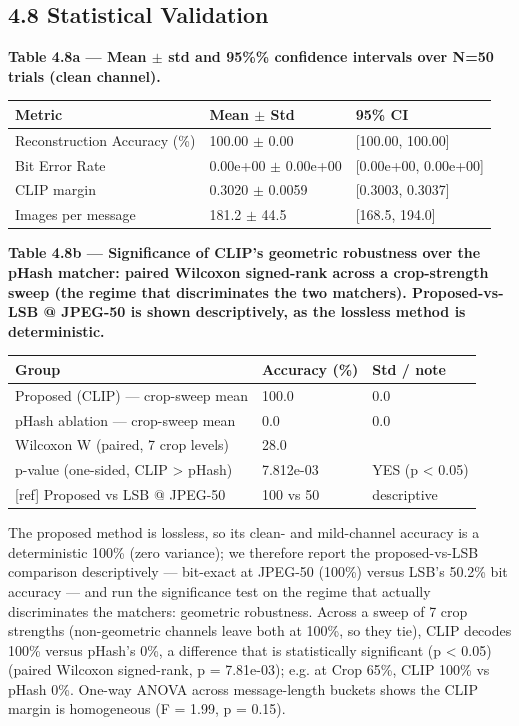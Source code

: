 \documentclass[11pt]{article}
\begin{document}
\subsection*{4.8 Statistical Validation}
\textbf{Table 4.8a --- Mean $\pm$ std and 95\%\% confidence intervals over N=50 trials (clean channel).}
\begin{table}[H]\centering\small
\begin{tabularx}{\textwidth}{lXX}
\toprule
Metric & Mean $\pm$ Std & 95\% CI \\
\midrule
Reconstruction Accuracy (\%) & 100.00 $\pm$ 0.00 & {}[100.00, 100.00] \\
Bit Error Rate & 0.00e+00 $\pm$ 0.00e+00 & {}[0.00e+00, 0.00e+00] \\
CLIP margin & 0.3020 $\pm$ 0.0059 & {}[0.3003, 0.3037] \\
Images per message & 181.2 $\pm$ 44.5 & {}[168.5, 194.0] \\
\bottomrule
\end{tabularx}
\end{table}
\textbf{Table 4.8b --- Significance of CLIP's geometric robustness over the pHash matcher: paired Wilcoxon signed-rank across a crop-strength sweep (the regime that discriminates the two matchers). Proposed-vs-LSB @ JPEG-50 is shown descriptively, as the lossless method is deterministic.}
\begin{table}[H]\centering\small
\begin{tabularx}{\textwidth}{lXX}
\toprule
Group & Accuracy (\%) & Std / note \\
\midrule
Proposed (CLIP) --- crop-sweep mean & 100.0 & 0.0 \\
pHash ablation --- crop-sweep mean & 0.0 & 0.0 \\
Wilcoxon W (paired, 7 crop levels) & 28.0 &  \\
p-value (one-sided, CLIP > pHash) & 7.812e-03 & YES (p < 0.05) \\
{}[ref] Proposed vs LSB @ JPEG-50 & 100 vs 50 & descriptive \\
\bottomrule
\end{tabularx}
\end{table}
The proposed method is lossless, so its clean- and mild-channel accuracy is a deterministic 100\% (zero variance); we therefore report the proposed-vs-LSB comparison descriptively --- bit-exact at JPEG-50 (100\%) versus LSB's 50.2\% bit accuracy --- and run the significance test on the regime that actually discriminates the matchers: geometric robustness. Across a sweep of 7 crop strengths (non-geometric channels leave both at 100\%, so they tie), CLIP decodes 100\% versus pHash's 0\%, a difference that is statistically significant (p < 0.05) (paired Wilcoxon signed-rank, p = 7.81e-03); e.g. at Crop 65\%, CLIP 100\% vs pHash 0\%. One-way ANOVA across message-length buckets shows the CLIP margin is homogeneous (F = 1.99, p = 0.15).
\end{document}
